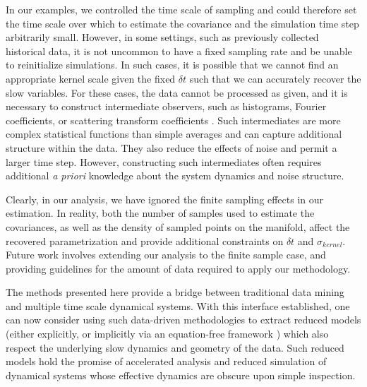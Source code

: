 In our examples, we controlled the time scale of sampling and could therefore set the time scale over which to estimate the covariance and the simulation time step arbitrarily small.
%
However, in some settings, such as previously collected historical data, it is not uncommon to have a fixed sampling rate and be unable to reinitialize simulations.
%
In such cases, it is possible that we cannot find an appropriate kernel scale given the fixed $\delta t$ such that we can accurately recover the slow variables.
%
For these cases, the data cannot be processed as given,
and it is necessary to construct intermediate observers,
such as histograms, Fourier coefficients, or scattering transform coefficients \cite{mallat2012group, talmon2014intrinsic, talmon2014manifold}.
%
Such intermediates are more complex statistical functions than simple averages and can capture additional structure within the data.
%
They also reduce the effects of noise and permit a larger time step.
%
However, constructing such intermediates often requires additional {\em a priori} knowledge about the system dynamics and noise structure.

Clearly, in our analysis, we have ignored the finite sampling effects in our estimation.
%
In reality, both the number of samples used to estimate the covariances, as well as the density of sampled points on the manifold, affect the recovered parametrization and provide additional constraints on $\delta t$ and $\sigma_{kernel}$.
%
Future work involves extending our analysis to the finite sample case, and providing guidelines for the amount of data required to apply our methodology.

The methods presented here provide a bridge between traditional data mining and multiple time scale dynamical systems.
%
With this interface established, one can now consider using such data-driven methodologies to extract reduced models (either explicitly, or implicitly via an equation-free framework \cite{erban2006gene, kevrekidis2004equation, kevrekidis2003equation,  kevrekidis2009equation}) which also respect the underlying slow dynamics and geometry of the data.
%
Such reduced models hold the promise of accelerated analysis and reduced simulation of dynamical systems whose effective dynamics are obscure upon simple inspection.

